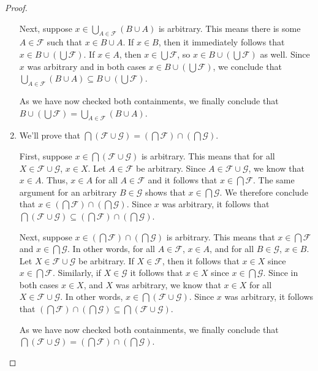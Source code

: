 \documentclass[12pt]{amsart}
\theoremstyle{definition}
\theoremstyle{remark}
\begin{document}
\begin{proof}
\begin{enumerate}
	Next, suppose $x \in \bigcup_{A \in \mathcal{F}} (B \cup A)$ is arbitrary.
	This means there is some $A \in \mathcal{F}$ such that $x \in B \cup A$.
	If $x \in B$, then it immediately follows that $x \in B \cup \left( \bigcup \mathcal{F} \right)$.
	If $x \in A$, then $x \in \bigcup \mathcal{F}$, so $x \in B \cup \left( \bigcup \mathcal{F} \right)$
	as well.
	Since $x$ was arbitrary and in both cases $x \in B \cup \left( \bigcup \mathcal{F} \right)$,
	we conclude that $\bigcup_{A \in \mathcal{F}} (B \cup A) \subseteq
	B \cup \left( \bigcup \mathcal{F} \right)$.
	
	As we have now checked both containments, we finally conclude that
	$B \cup \left( \bigcup \mathcal{F} \right) = 
	\bigcup_{A \in \mathcal{F}} (B \cup A)$.
	
	\item We'll prove that $\bigcap (\mathcal{F} \cup \mathcal{G}) =
	\left( \bigcap \mathcal{F} \right) \cap \left( \bigcap \mathcal{G} \right)$.
	
	First, suppose $x \in \bigcap (\mathcal{F} \cup \mathcal{G})$ is arbitrary.
	This means that for all $X \in \mathcal{F} \cup \mathcal{G}$, $x \in X$.
	Let $A \in \mathcal{F}$ be arbitrary.
	Since $A \in \mathcal{F} \cup \mathcal{G}$, we know that $x \in A$.
	Thus, $x \in A$ for all $A \in \mathcal{F}$ and it follows that $x \in \bigcap \mathcal{F}$.
	The same argument for an arbitrary $B \in \mathcal{G}$ shows that $x \in \bigcap \mathcal{G}$.
	We therefore conclude that 
	$x \in \left( \bigcap \mathcal{F} \right) \cap \left( \bigcap \mathcal{G} \right)$.
	Since $x$ was arbitrary, it follows that $\bigcap (\mathcal{F} \cup \mathcal{G}) \subseteq
	\left( \bigcap \mathcal{F} \right) \cap \left( \bigcap \mathcal{G} \right)$.
	
	Next, suppose $x \in \left( \bigcap \mathcal{F} \right) \cap \left( \bigcap \mathcal{G} \right)$
	is arbitrary.
	This means that $x \in \bigcap \mathcal{F}$ and $x \in \bigcap \mathcal{G}$.
	In other words, for all $A \in \mathcal{F}$, $x \in A$, and for all $B \in \mathcal{G}$, $x \in B$.
	Let $X \in \mathcal{F} \cup \mathcal{G}$ be arbitrary.
	If $X \in \mathcal{F}$, then it follows that $x \in X$ since $x \in \bigcap \mathcal{F}$.
	Similarly, if $X \in \mathcal{G}$ it follows that $x \in X$ since $x \in \bigcap \mathcal{G}$.
	Since in both cases $x \in X$, and $X$ was arbitrary, we know that $x \in X$ for all
	$X \in \mathcal{F} \cup \mathcal{G}$.
	In other words, $x \in \bigcap (\mathcal{F} \cup \mathcal{G})$.
	Since $x$ was arbitrary, it follows that
	$\left( \bigcap \mathcal{F} \right) \cap \left( \bigcap \mathcal{G} \right) \subseteq
	\bigcap (\mathcal{F} \cup \mathcal{G})$.
	
	As we have now checked both containments, we finally conclude that
	$\bigcap (\mathcal{F} \cup \mathcal{G}) =
	\left( \bigcap \mathcal{F} \right) \cap \left( \bigcap \mathcal{G} \right)$.
\end{enumerate}
\end{proof}
\end{document}
